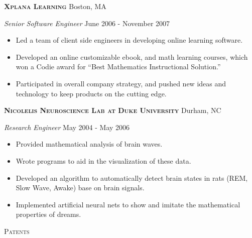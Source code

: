 \documentclass[a4paper]{article}
\newcommand{\lineunder} {
    \vspace*{-8pt} \\
    \hspace*{-18pt} \hrulefill \\
}
\newcommand{\header} [1] {
    {\hspace*{-18pt}\vspace*{6pt} \textsc{#1}}
    \vspace*{-6pt} \lineunder
    \vspace{2mm}
}
\begin{document}
\textbf{\textsc{Xplana Learning}} \hfill Boston, MA\\
\vspace{2mm}

\begin{addmargin}[1em]{0em}

\textit{Senior Software Engineer} \hfill June 2006 - November 2007\\
\vspace{-1mm}
\begin{itemize} \itemsep 1pt
    \item Led a team of client side engineers in developing online learning software.
    \item Developed an online customizable ebook, and math learning courses, which 
        won a Codie award for ``Best Mathematics Instructional Solution.''
    \item Participated in overall company strategy, and pushed new ideas and technology 
        to keep products on the cutting edge.
\end{itemize}

\end{addmargin}

\textbf{\textsc{Nicolelis Neuroscience Lab at Duke University}} \hfill Durham, NC\\
\vspace{2mm}

\begin{addmargin}[1em]{0em}

\textit{Research Engineer} \hfill May 2004 - May 2006\\
\vspace{-1mm}
\begin{itemize} \itemsep 1pt
    \item Provided mathematical analysis of brain waves.
    \item Wrote programs to aid in the visualization of these data.
    \item Developed an algorithm to automatically detect brain states 
        in rats (REM, Slow Wave, Awake) base on brain signals.
    \item Implemented artificial neural nets to show and imitate the 
        mathematical properties of dreams.

\end{itemize}

\end{addmargin}

\header{\faLightbulbO \hspace{1pt} Patents}
\end{document}
